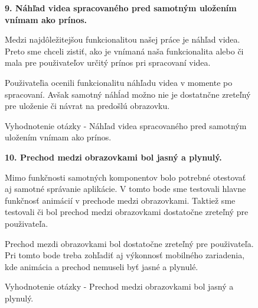 \begin{figure}[H]
\textbf{9. Náhľad videa spracovaného pred samotným uložením vnímam ako prínos. }

Medzi najdôležitejšou funkcionalitou našej práce je náhľad videa. Preto sme chceli zistiť, ako je vnímaná naša funkcionalita alebo či mala pre použivateľov určitý prínos pri spracovaní videa.

Použivateľia ocenili funkcionalitu náhľadu videa v momente po spracovaní. Avšak samotný náhĺad možno nie je dostatnčne zreteľný pre uloženie či návrat na predošlú obrazovku. 
\caption{Vyhodnotenie otázky - Náhľad videa spracovaného pred samotným uložením vnímam ako prínos.}
\end{figure}


\begin{figure}[H]
\textbf{10. Prechod medzi obrazovkami
bol jasný a plynulý.}

Mimo funkčnosti samotných komponentov bolo potrebné otestovať aj samotné správanie aplikácie. V tomto bode sme testovali hlavne funkčnosť animácií v prechode medzi obrazovkami. Taktiež sme testovali či bol prechod medzi obrazovkami dostatočne zreteľný pre použivateľa.

Prechod mezdi obrazovkami bol dostatočne zreteľný pre použivateľa. Pri tomto bode treba zohľadiť aj výkonnosť mobilného zariadenia, kde animácia a prechod nemuseli byť jasné a plynulé.

\caption{Vyhodnotenie otázky - Prechod medzi obrazovkami
bol jasný a plynulý.}
\end{figure}


